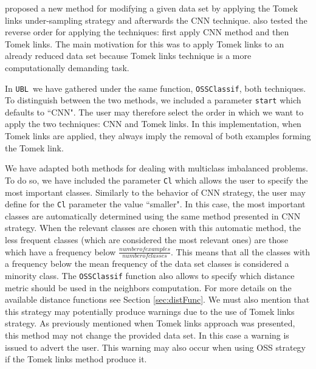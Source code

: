 \documentclass[10pt,a4paper]{article}\usepackage[]{graphicx}\usepackage[]{color}
\newcommand{\UBL}{\texttt{UBL}\ }
\begin{document}
\cite{KM97} proposed a new method for modifying a given data set by applying the Tomek links under-sampling strategy and afterwards the CNN technique. \cite{batista2004study} also tested the reverse order for applying the techniques: first apply CNN method and then Tomek links. The main motivation for this was to apply Tomek links to an already reduced data set because Tomek links technique is a more computationally demanding task.

In \UBL we have gathered under the same function, \texttt{OSSClassif}, both techniques. To distinguish between the two methods, we included a parameter \texttt{start} which defaults to ``CNN". The user may therefore select the order in which we want to apply the two techniques: CNN and Tomek links. In this implementation, when Tomek links are applied, they always imply the removal of both examples forming the Tomek link. 

We have adapted both methods for dealing with multiclass imbalanced problems. To do so, we have included the parameter \texttt{Cl} which allows the user to specify the most important classes. Similarly to the behavior of CNN strategy, the user may define for the \texttt{Cl} parameter the value ``smaller". In this case, the most important classes are automatically determined using the same method presented in CNN strategy. When the relevant classes are chosen with this automatic method, the less frequent classes (which are considered the most relevant ones) are those which have a frequency below $\frac{number of examples}{number of classes}$. This means that all the classes with a frequency below the mean frequency of the data set classes is considered a minority class. The \texttt{OSSClassif} function also allows to specify which distance metric should be used in the neighbors computation. For more details on the available distance functions see Section \ref{sec:distFunc}. We must also mention that this strategy may potentially produce warnings due to the use of Tomek links strategy. As previously mentioned when Tomek links approach was presented, this method may not change the provided data set. In this case a warning is issued to advert the user. This warning may also occur when using OSS strategy if the Tomek links method produce it.
\end{document}
